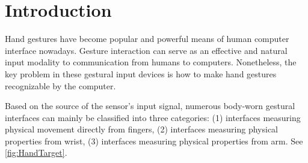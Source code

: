 \documentclass{sigchi}
\begin{document}
 



\section{Introduction}
Hand gestures have become popular and powerful means of human computer interface nowadays.
Gesture interaction can serve as an effective and natural input modality to communication from humans to computers.
Nonetheless, the key problem in these gestural input devices is how to make hand gestures recognizable by the computer.




Based on the source of the sensor's input signal, numerous body-worn gestural interfaces can mainly be classified into three categories: (1) interfaces measuring physical movement directly from fingers, (2) interfaces measuring physical properties from wrist, (3) interfaces measuring physical properties from arm. See \autoref{fig:HandTarget}.

\end{document}
